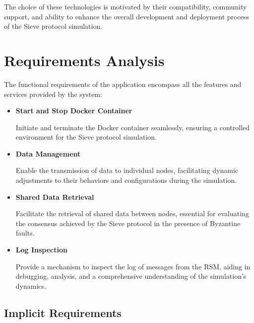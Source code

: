 \documentclass{scrartcl}
\begin{document}
The choice of these technologies is motivated by their compatibility, community support, and ability to enhance the overall development and deployment process of the Sieve protocol simulation.




\section{Requirements Analysis}

The functional requirements of the application encompass all the features and services provided by the system:

\begin{itemize}
    \item \textbf{Start and Stop Docker Container}
    
    Initiate and terminate the Docker container seamlessly, ensuring a controlled environment for the Sieve protocol simulation.
    \item \textbf{Data Management}
    
    Enable the transmission of data to individual nodes, facilitating dynamic adjustments to their behaviors and configurations during the simulation.
    \item \textbf{Shared Data Retrieval}
    
    Facilitate the retrieval of shared data between nodes, essential for evaluating the consensus achieved by the Sieve protocol in the presence of Byzantine faults.
    \item \textbf{Log Inspection}
    
    Provide a mechanism to inspect the log of messages from the RSM, aiding in debugging, analysis, and a comprehensive understanding of the simulation's dynamics.
\end{itemize}

\subsection{Implicit Requirements}
\end{document}
